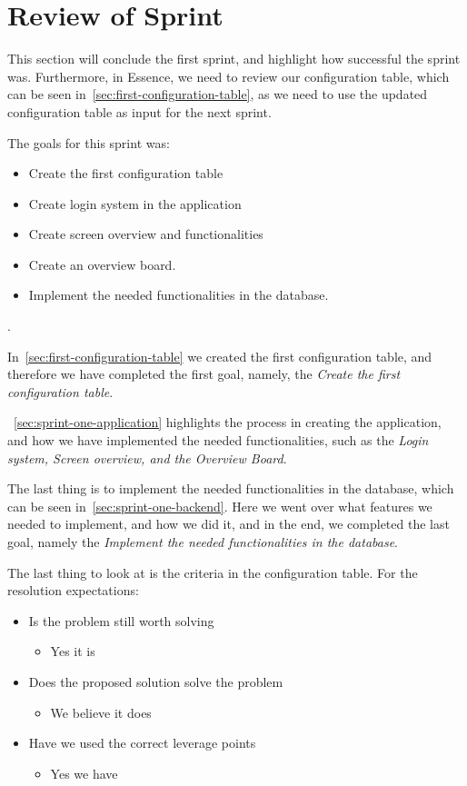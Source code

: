 \section{Review of Sprint}\label{sec:review-sprint-anne}
This section will conclude the first sprint, and highlight how successful the sprint was.
Furthermore, in Essence, we need to review our configuration table, which can be seen in~\autoref{sec:first-configuration-table}, as we need to use the updated configuration table as input for the next sprint.

The goals for this sprint was:

\begin{itemize}
    \item Create the first configuration table 
    \item Create login system in the application
    \item Create screen overview and functionalities
    \item Create an overview board.
    \item Implement the needed functionalities in the database.
\end{itemize}.

In~\autoref{sec:first-configuration-table} we created the first configuration table, and therefore we have completed the first goal, namely, the \textit{Create the first configuration table}.

~\autoref{sec:sprint-one-application} highlights the process in creating the application, and how we have implemented the needed functionalities, such as the \textit{Login system, Screen overview, and the Overview Board}.

The last thing is to implement the needed functionalities in the database, which can be seen in~\autoref{sec:sprint-one-backend}.
Here we went over what features we needed to implement, and how we did it, and in the end, we completed the last goal, namely the \textit{Implement the needed functionalities in the database}.

The last thing to look at is the criteria in the configuration table.
For the resolution expectations:

\begin{itemize}
    \item Is the problem still worth solving
    \begin{itemize}
        \item Yes it is
    \end{itemize}
    \item Does the proposed solution solve the problem
    \begin{itemize}
        \item We believe it does
    \end{itemize}
    \item Have we used the correct leverage points
    \begin{itemize}
        \item Yes we have
    \end{itemize}
\end{itemize}

